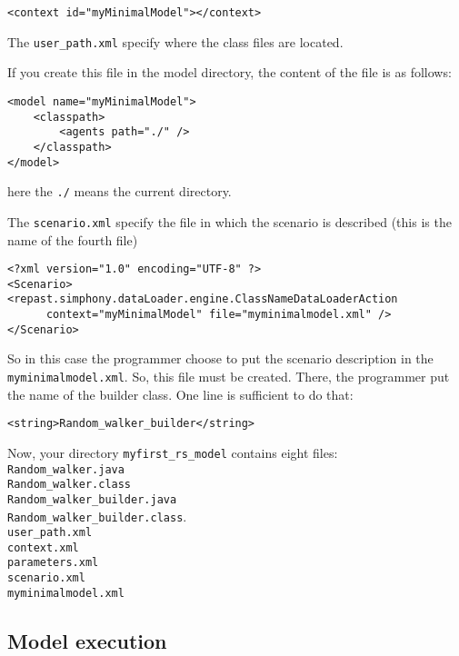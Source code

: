 \documentclass{article}
\begin{document}
\begin{verbatim}
<context id="myMinimalModel"></context>
\end{verbatim}

The \verb+user_path.xml+ specify where the class files are located. 

If you create this file in the model directory, the content of the file is as follows:

\begin{verbatim}
<model name="myMinimalModel">
	<classpath>
		<agents path="./" />
	</classpath>
</model>
\end{verbatim}

here the \verb+./+ means the current directory.

The \verb+scenario.xml+ specify the file in which the scenario is described (this is the name of the fourth file)

\begin{verbatim}
<?xml version="1.0" encoding="UTF-8" ?>
<Scenario>
<repast.simphony.dataLoader.engine.ClassNameDataLoaderAction 
      context="myMinimalModel" file="myminimalmodel.xml" />
</Scenario>
\end{verbatim}

So in this case the programmer choose to put the scenario description in the \verb+myminimalmodel.xml+. So, this file must be created. 
There, the programmer put the name of the builder class. One line is sufficient to do that:


\begin{verbatim}
<string>Random_walker_builder</string>
\end{verbatim}

Now, your directory \verb+myfirst_rs_model+ contains eight files:\\
\verb+Random_walker.java+\\
\verb+Random_walker.class+\\
\verb+Random_walker_builder.java+\\
\verb+Random_walker_builder.class+.\\
\verb+user_path.xml+\\
\verb+context.xml+\\
\verb+parameters.xml+\\
\verb+scenario.xml+\\
\verb+myminimalmodel.xml+

\subsection{Model execution}
\end{document}

